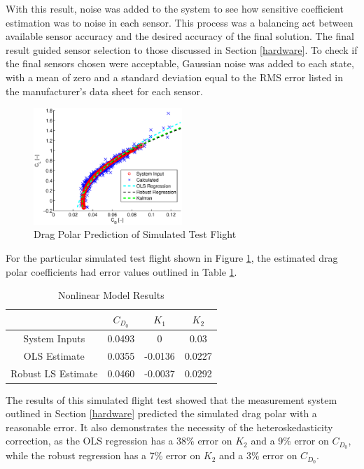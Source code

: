 With this result, noise was added to the system to see how sensitive coefficient estimation was to noise in each sensor. This process was a balancing act between available sensor accuracy and the desired accuracy of the final solution. The final result guided sensor selection to those discussed in Section \ref{hardware}. To check if the final sensors chosen were acceptable, Gaussian noise was added to each state, with a mean of zero and a standard deviation equal to the RMS error listed in the manufacturer's data sheet for each sensor.
\begin{figure}[H]

  \centering
    \includegraphics[width=0.5\textwidth]{figures/simDragPolarNoise.eps}
      \caption{Drag Polar Prediction of Simulated Test Flight} \label{dragPolarNoise}
\end{figure}

For the particular simulated test flight shown in Figure \ref{dragPolarNoise}, the estimated drag polar coefficients had error values outlined in Table \ref{simCoeffErrorTable}.

\begin{table}[ht]
\caption{Nonlinear Model Results} %
\centering %
\begin{tabular}{c c c c} %
\hline\hline %
 & $C_{D_0}$ & $K_1$ & $K_2$ \\ [0.5ex] %
\hline %
System Inputs & 0.0493 & 0 & 0.03 \\ %
OLS Estimate & 0.0355 & -0.0136 & 0.0227 \\
Robust LS Estimate & 0.0460 & -0.0037 & 0.0292 \\ [1ex] %
\hline %
\end{tabular}
\label{simCoeffErrorTable} %
\end{table}
The results of this simulated flight test showed that the measurement system outlined in Section \ref{hardware} predicted the simulated drag polar with a reasonable error. It also demonstrates
 the necessity of the heteroskedasticity correction, as the OLS regression has a 38\% error on $K_2$ and a 9\% error on $C_{D_0}$, while the robust regression has a 7\% error on $K_2$ and a 3\% error on $C_{D_0}$.